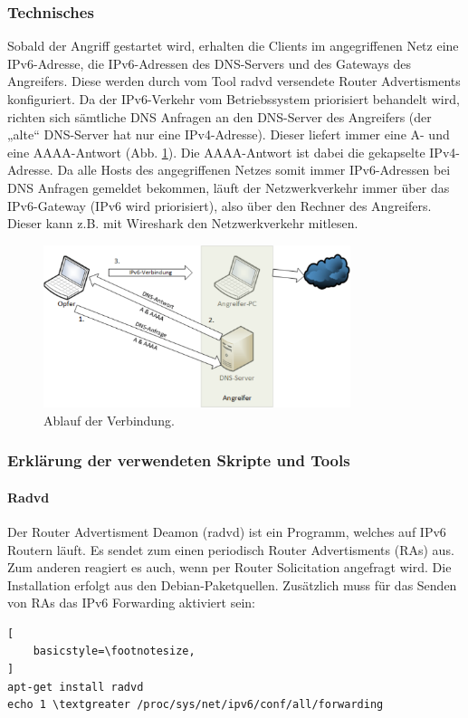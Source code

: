 \subsubsection*{Technisches}
Sobald der Angriff gestartet wird, erhalten die Clients im angegriffenen Netz eine IPv6-Adresse, die IPv6-Adressen des DNS-Servers und des Gateways des Angreifers. Diese werden durch vom Tool radvd versendete Router Advertisments konfiguriert. Da der IPv6-Verkehr vom Betriebssystem priorisiert behandelt wird, richten sich sämtliche DNS Anfragen an den DNS-Server des Angreifers (der „alte“ DNS-Server hat nur eine IPv4-Adresse). 
Dieser liefert immer eine A- und eine AAAA-Antwort (Abb. \ref{fig:fakeIPv6DNS}). Die AAAA-Antwort ist dabei die gekapselte IPv4-Adresse. Da alle Hosts des angegriffenen Netzes somit immer IPv6-Adressen bei DNS Anfragen gemeldet bekommen, läuft der Netzwerkverkehr immer über das IPv6-Gateway (IPv6 wird priorisiert), also über den Rechner des Angreifers. Dieser kann z.B. mit Wireshark den Netzwerkverkehr mitlesen.

\begin{figure}[h!]
	\centering
	\includegraphics[width=0.8\textwidth]{bilder/fakeIPv6/fakeIPv6DNS.pdf}
	\caption{Ablauf der Verbindung.}
	\label{fig:fakeIPv6DNS}
\end{figure}

\subsubsection*{Erklärung der verwendeten Skripte und Tools}

\paragraph*{Radvd}
Der Router Advertisment Deamon (radvd) ist ein Programm, welches auf IPv6 Routern läuft. Es sendet zum einen periodisch Router Advertisments (RAs) aus. Zum anderen reagiert es auch, wenn per Router Solicitation angefragt wird. Die Installation erfolgt aus den Debian-Paketquellen. Zusätzlich muss für das Senden von RAs das IPv6 Forwarding aktiviert sein:
\lstset{language=bash}
\begin{lstlisting}[
	basicstyle=\footnotesize,
]
apt-get install radvd
echo 1 \textgreater /proc/sys/net/ipv6/conf/all/forwarding
\end{lstlisting}

